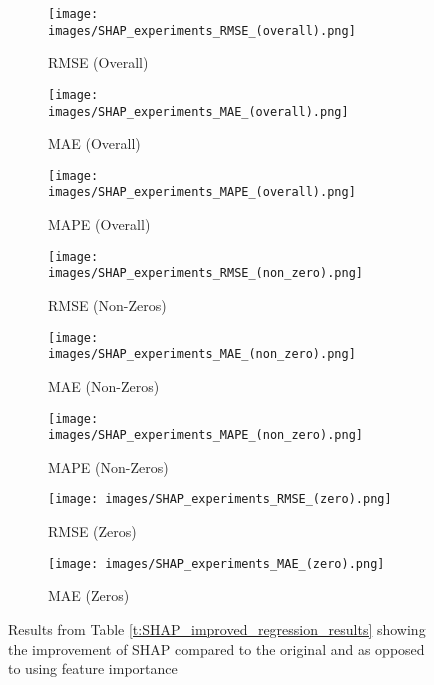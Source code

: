 \documentclass{article}
\begin{document}
\begin{figure}[H]
    \centering
    \begin{subfigure}[b]{0.32\textwidth}
        \texttt{[image: images/SHAP\_experiments\_RMSE\_(overall).png]}
        \caption{RMSE (Overall)}
    \end{subfigure}
    \hfill
    \begin{subfigure}[b]{0.32\textwidth}
        \texttt{[image: images/SHAP\_experiments\_MAE\_(overall).png]}
        \caption{MAE (Overall)}
    \end{subfigure}
    \hfill
    \begin{subfigure}[b]{0.32\textwidth}
        \texttt{[image: images/SHAP\_experiments\_MAPE\_(overall).png]}
        \caption{MAPE (Overall)}
    \end{subfigure}

    \vspace{0.7cm}
    \begin{subfigure}[b]{0.32\textwidth}
        \texttt{[image: images/SHAP\_experiments\_RMSE\_(non\_zero).png]}
        \caption{RMSE (Non-Zeros)}
    \end{subfigure}
    \hfill
    \begin{subfigure}[b]{0.32\textwidth}
        \texttt{[image: images/SHAP\_experiments\_MAE\_(non\_zero).png]}
        \caption{MAE (Non-Zeros)}
    \end{subfigure}
    \hfill
    \begin{subfigure}[b]{0.32\textwidth}
        \texttt{[image: images/SHAP\_experiments\_MAPE\_(non\_zero).png]}
        \caption{MAPE (Non-Zeros)}
    \end{subfigure}

    \vspace{0.7cm}
    \begin{subfigure}[b]{0.30\textwidth}
        \texttt{[image: images/SHAP\_experiments\_RMSE\_(zero).png]}
        \caption{RMSE (Zeros)}
    \end{subfigure}
    \hfill
    \begin{subfigure}[b]{0.30\textwidth}
        \texttt{[image: images/SHAP\_experiments\_MAE\_(zero).png]}
        \caption{MAE (Zeros)}
    \end{subfigure}
    \caption{Results from Table \ref{t:SHAP_improved_regression_results} showing the improvement of SHAP compared to the original and as opposed to using feature importance}
    \label{fig:SHAP_improved_regression_results}
\end{figure}
\end{document}

